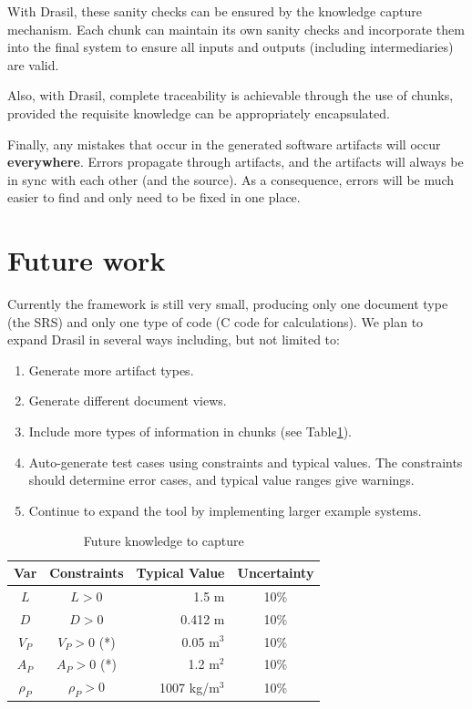 \documentclass{sig-alternate-05-2015}
\newcommand{\lss}{Drasil}
\begin{document}
With \lss, these sanity checks can be ensured by the knowledge capture
mechanism. Each chunk can maintain its own sanity checks and incorporate them
into the final system to ensure all inputs and outputs (including
intermediaries) are valid.

Also, with \lss{}, complete traceability is achievable through the use of
chunks, provided the requisite knowledge can be appropriately encapsulated.

Finally, any mistakes that occur in the generated software artifacts will occur
\textbf{everywhere}. Errors propagate through artifacts, and the artifacts will
always be in sync with each other (and the source). As a consequence, errors
will be much easier to find and only need to be fixed in one place.

\section{Future work} \label{sec:todo}

Currently the framework is still very small, producing only one document type
(the SRS) and only one type of code (C code for calculations). We plan to expand
\lss{} in several ways including, but not limited to:

\begin{enumerate}
\setlength{\itemsep}{0pt}
\setlength{\parskip}{0pt}
\setlength{\parsep}{0pt}
\item Generate more artifact types. %
\item Generate different document views. %
\item Include more types of information in chunks (see Table\ref{tab:pcm}).
\item Auto-generate test cases using constraints and typical values. The
  constraints should determine error cases, and typical value ranges give
  warnings.
\item Continue to expand the tool by implementing larger example systems.
\end{enumerate}

\begin{table} \label{tab:pcm}
\centering
\caption{Future knowledge to capture}
\begin{tabular}{|c|c|r|c|} \hline
\textbf{Var} & \textbf{Constraints} & \textbf{Typical Value} & \textbf{Uncertainty}\\ \hline
$L$ & $L > 0$ & 1.5 m & 10\% \\ \hline
$D$ & $D > 0$ & 0.412 m & 10\% \\ \hline
$V_P$ & $V_P > 0$ (*)	& 0.05 m$^3$	& 10\% \\ \hline
$A_P$ & $A_P > 0$ (*)	& 1.2 m$^2$	& 10\% \\ \hline
$\rho_P$ & $\rho_P > 0$	& 1007 kg/m$^3$	& 10\% \\
\hline\end{tabular}
\end{table}
\end{document}
